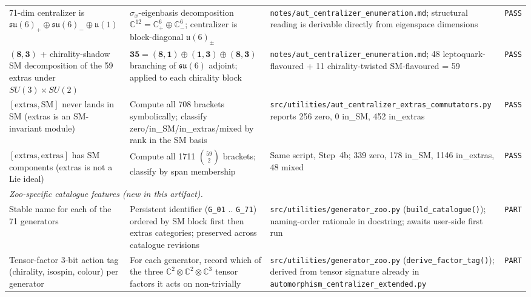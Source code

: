 {\begin{longtable}{@{}p{3.4cm}p{4.0cm}p{4.6cm}p{1.0cm}@{}}
71-dim centralizer is
$\mathfrak{su}(6)_+ \oplus \mathfrak{su}(6)_- \oplus \mathfrak{u}(1)$
    & $\sigma_x$-eigenbasis decomposition $\mathbb{C}^{12} =
      \mathbb{C}^6_+ \oplus \mathbb{C}^6_-$; centralizer is
      block-diagonal $\mathfrak{u}(6)_\pm$
    & \texttt{notes/aut\_centralizer\_enumeration.md}; structural
      reading is derivable directly from eigenspace dimensions
    & \texttt{PASS} \\

$(\mathbf{8}, \mathbf{3})$ + chirality-shadow SM
decomposition of the 59 extras under $SU(3) \times SU(2)$
    & $\mathbf{35} = (\mathbf{8}, \mathbf{1}) \oplus (\mathbf{1},
      \mathbf{3}) \oplus (\mathbf{8}, \mathbf{3})$ branching of
      $\mathfrak{su}(6)$ adjoint; applied to each chirality block
    & \texttt{notes/aut\_centralizer\_enumeration.md};
      48 leptoquark-flavoured + 11 chirality-twisted SM-flavoured =
      59
    & \texttt{PASS} \\

$[\text{extras}, \text{SM}]$ never lands in SM (extras is an
SM-invariant module)
    & Compute all 708 brackets symbolically; classify
      zero/in\_SM/in\_extras/mixed by rank in the SM basis
    & \texttt{src/utilities/aut\_centralizer\_extras\_commutators.py}
      reports 256 zero, 0 in\_SM, 452 in\_extras
    & \texttt{PASS} \\

$[\text{extras}, \text{extras}]$ has SM components (extras is not a
Lie ideal)
    & Compute all 1711 $\binom{59}{2}$ brackets; classify by
      span membership
    & Same script, Step~4b; 339 zero, 178 in\_SM, 1146 in\_extras,
      48 mixed
    & \texttt{PASS} \\

\hline
\multicolumn{4}{l}{\textit{Zoo-specific catalogue features (new in this artifact).}} \\
\hline

Stable name for each of the 71 generators
    & Persistent identifier (\texttt{G\_01} .. \texttt{G\_71})
      ordered by SM block first then extras categories; preserved
      across catalogue revisions
    & \texttt{src/utilities/generator\_zoo.py} (\texttt{build\_catalogue()});
      naming-order rationale in docstring; awaits user-side first run
    & \texttt{PART} \\

Tensor-factor 3-bit action tag (chirality, isospin, colour) per
generator
    & For each generator, record which of the three
      $\mathbb{C}^2 \otimes \mathbb{C}^2 \otimes \mathbb{C}^3$
      tensor factors it acts on non-trivially
    & \texttt{src/utilities/generator\_zoo.py}
      (\texttt{derive\_factor\_tag()}); derived from tensor signature
      already in \texttt{automorphism\_centralizer\_extended.py}
    & \texttt{PART} \\


\end{longtable}}
